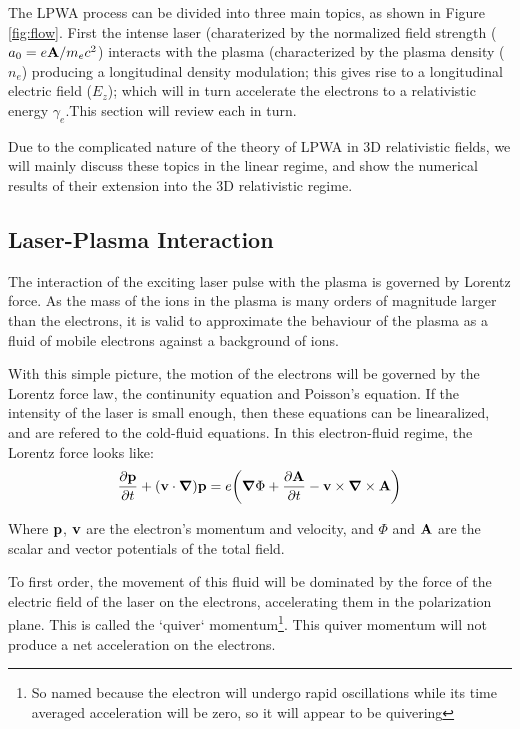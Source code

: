 \documentclass[12pt,letter]{article}
\begin{document}
The LPWA process can be divided into three main topics, as shown in Figure
\ref{fig:flow}. First the intense laser (charaterized
by the normalized field strength ($a_0 = e\vb{A}/m_e c^2$) interacts with the
plasma (characterized by the plasma density ($n_e$) producing a longitudinal
density modulation; this gives rise to a longitudinal electric field ($E_z$);
which will in turn accelerate the electrons to a relativistic energy
$\gamma_e$.This section will review each in turn.

Due to the complicated nature of the theory of LPWA in 3D relativistic fields, we will mainly
discuss these topics in the linear regime, and show the numerical results of
their extension into the 3D relativistic regime.

\subsection{Laser-Plasma Interaction}
 The interaction of the exciting laser
pulse with the plasma is governed by Lorentz force\cite{jackson}. As the
mass of the ions in the plasma is many orders of magnitude larger than the
electrons, it is valid to approximate the behaviour of the plasma as a fluid of
mobile electrons against a background of ions.

With this simple picture, the motion of the electrons will be governed by the
Lorentz force law, the continunity equation and Poisson's equation. If the
intensity of the laser is small enough, then these equations can be
linearalized, and are refered to the cold-fluid
equations\cite{gorbunov1987excitation}.
In this electron-fluid regime, the Lorentz force looks like:
\begin{align}
    \label{eq:fullLPWA}
    \pdv{\vb{p}}{t} +(\vb{v} \cdot \grad)\vb{p} = e \qty( \grad \Phi
    +\pdv{\vb{A}}{t} - \vb{v}\times \grad \times \vb{A} )
\end{align}

Where $\vb{p}$, $\vb{v}$ are the electron's momentum and velocity, and $\Phi$
and $\vb{A}$ are the scalar and vector potentials of the total field.

To first order, the movement of this fluid will be dominated by the force of the
electric field of the laser on the electrons, accelerating them in the polarization
plane. This is called the `quiver` momentum\footnote{So named because the electron will
undergo rapid oscillations while its time averaged acceleration will be zero, so it will appear to be quivering}. This quiver momentum will not produce a net acceleration on the 
electrons.
\end{document}

